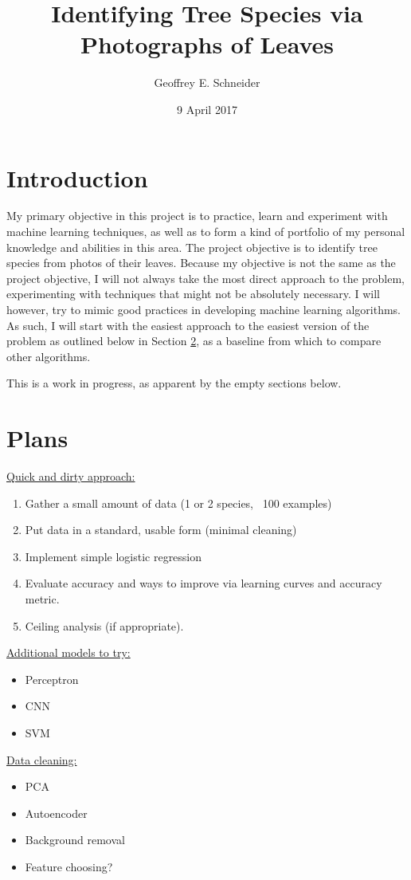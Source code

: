 \documentclass[12pt]{article}
\title{Identifying Tree Species via Photographs of Leaves}
\date{9 April 2017}
\author{Geoffrey E. Schneider}
\begin{document}
\maketitle
\section{Introduction} My primary objective in this project is to practice, learn and experiment with machine learning techniques, as well as to form a kind of portfolio of my personal knowledge and abilities in this area. The project objective is to identify tree species from photos of their leaves. Because my objective is not the same as the project objective, I will not always take the most direct approach to the problem, experimenting with techniques that might not be absolutely necessary. I will however, try to mimic good practices in developing machine learning algorithms. As such, I will start with the easiest approach to the easiest version of the problem as outlined below in Section \ref{sec:plans}, as a baseline from which to compare other algorithms.

This is a work in progress, as apparent by the empty sections below.

\section{Plans} \label{sec:plans}
\underline{Quick and dirty approach:}
\begin{enumerate}
 \item Gather a small amount of data (1 or 2 species, ~100 examples)
 \item Put data in a standard, usable form (minimal cleaning)
 \item Implement simple logistic regression
 \item Evaluate accuracy and ways to improve via learning curves and accuracy metric.
 \item Ceiling analysis (if appropriate).
\end{enumerate}

\noindent \underline{Additional models to try:}
\begin{itemize}
 \item Perceptron
 \item CNN
 \item SVM  
\end{itemize}

\noindent \underline{Data cleaning:}
\begin{itemize}
 \item PCA
 \item Autoencoder
 \item Background removal
 \item Feature choosing?
\end{itemize}
\end{document}
